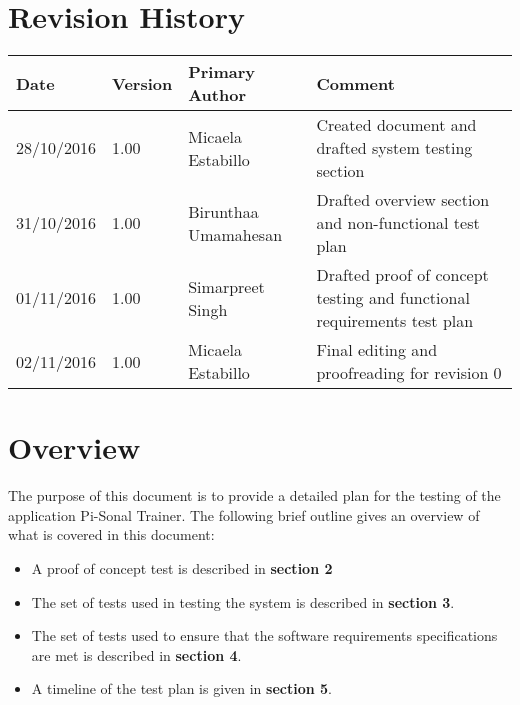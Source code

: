 \tableofcontents

\listoftables


\section*{Revision History}
\begingroup
\begin{tabular}{ | p{2cm} | p{1.5cm} | p{3.8cm} | p{7cm} |} 
    \hline
    \textbf{Date} & \textbf{Version} & \textbf{Primary Author} & \textbf{Comment}\\
    \hline
    28/10/2016 & 1.00 & Micaela Estabillo & Created document and drafted system testing section\\ 
    \hline
    31/10/2016 & 1.00 & Birunthaa Umamahesan & Drafted overview section and non-functional test plan\\
    \hline
    01/11/2016 & 1.00 & Simarpreet Singh & Drafted proof of concept testing and functional requirements test plan \\
    \hline
    02/11/2016 & 1.00 & Micaela Estabillo & Final editing and proofreading for revision 0\\
    \hline
\end{tabular}
\endgroup

\newpage

\section{Overview}
The purpose of this document is to provide a detailed plan for the testing of the application  Pi-Sonal Trainer. The following brief outline gives an overview of what is covered in this document:
\begin{itemize}
    \item A proof of concept test is described in \textbf{section 2}
    \item The set of tests used in testing the system is described in \textbf{section 3}.
    \item The set of tests used to ensure that the software requirements specifications are met is described in \textbf{section 4}.
    \item A timeline of the test plan is given in \textbf{section 5}. 
\end{itemize}

